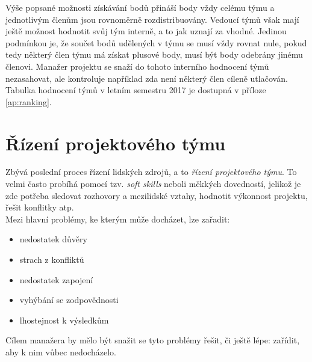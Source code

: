 Výše popsané možnosti získávání bodů přináší body vždy celému týmu a jednotlivým členům jsou rovnoměrně rozdistribuovány. Vedoucí týmů však mají ještě možnost hodnotit svůj tým interně, a to jak uznají za vhodné. Jedinou podmínkou je, že součet bodů udělených v týmu se musí vždy rovnat nule, pokud tedy některý člen týmu má získat plusové body, musí být body odebrány jinému členovi. Manažer projektu se snaží do tohoto interního hodnocení týmů nezasahovat, ale kontroluje například zda není některý člen cíleně utlačován.\\

Tabulka hodnocení týmů v letním semestru 2017 je dostupná v příloze \ref{ap:ranking}.


\section{Řízení projektového týmu}

Zbývá poslední proces řízení lidských zdrojů, a to \emph{řízení projektového týmu}. To velmi často probíhá pomocí tzv. \emph{soft skills} neboli měkkých dovedností, jelikož je zde potřeba sledovat rozhovory a mezilidské vztahy, hodnotit výkonnost projektu, řešit konflitky atp.\\
Mezi hlavní problémy, ke kterým může docházet, lze zařadit:
\begin{itemize}
	\item nedostatek důvěry
	\item strach z konfliktů
	\item nedostatek zapojení
	\item vyhýbání se zodpovědnosti
	\item lhostejnost k výsledkům
\end{itemize}
Cílem manažera by mělo být snažit se tyto problémy řešit, či ještě lépe: zařídit, aby k nim vůbec nedocházelo.

